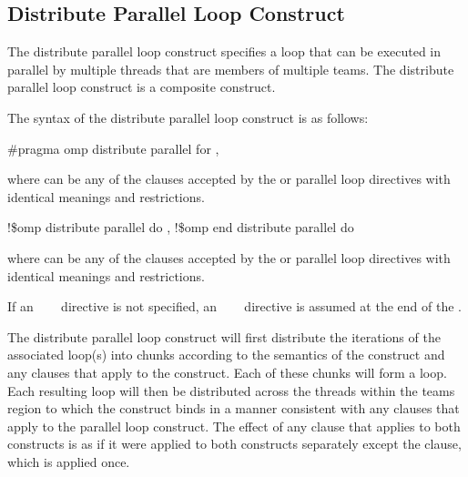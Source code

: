 {{{{\subsection{Distribute Parallel Loop Construct}
\label{subsec:Distribute Parallel Loop Construct}
\summary
The distribute parallel loop construct specifies a loop that can be executed in parallel by 
multiple threads that are members of multiple teams. The distribute parallel loop construct is a composite construct.

\syntax
The syntax of the distribute parallel loop construct is as follows:

\ccppspecificstart
\begin{boxedcode}
\#pragma omp distribute parallel for \plc{[clause[ [},\plc{] clause] ... ] newline}
\end{boxedcode}

where  can be any of the clauses accepted by the  or parallel loop 
directives with identical meanings and restrictions.
\ccppspecificend

\fortranspecificstart
\begin{boxedcode}
!\$omp distribute parallel do \plc{[clause[ [},\plc{] clause] ... ]}
\plc{[}!\$omp end distribute parallel do\plc{]}
\end{boxedcode}

where  can be any of the clauses accepted by the  or parallel loop 
directives with identical meanings and restrictions.

If an ~~~ directive is not specified, an 
~~~ directive is assumed at the end of the .
\fortranspecificend

\descr
The distribute parallel loop construct will first distribute the iterations of the associated loop(s) into chunks according to the semantics of the  construct and any clauses that apply to the  construct. Each of these chunks will form a loop. Each resulting loop will then be distributed across the threads within the teams region to which the  construct binds in a manner consistent with any clauses that apply to the parallel loop construct. 
The effect of any clause that applies to both constructs is as if it were applied to both constructs separately except the  clause, which is applied once.

}}}}
